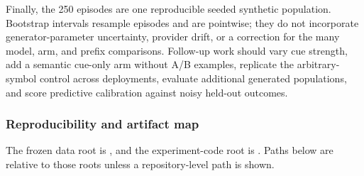 Finally, the 250 episodes are one reproducible seeded synthetic population.
Bootstrap intervals resample episodes and are pointwise; they do not incorporate
generator-parameter uncertainty, provider drift, or a correction for the many
model, arm, and prefix comparisons. Follow-up work should vary cue strength, add a
semantic cue-only arm without A/B examples, replicate the arbitrary-symbol control
across deployments, evaluate additional generated populations, and score predictive
calibration against noisy held-out outcomes.

\clearpage
\subsubsection{Reproducibility and artifact map}
The frozen data root is
,
and the experiment-code root is . Paths below are
relative to those roots unless a repository-level path is shown.

